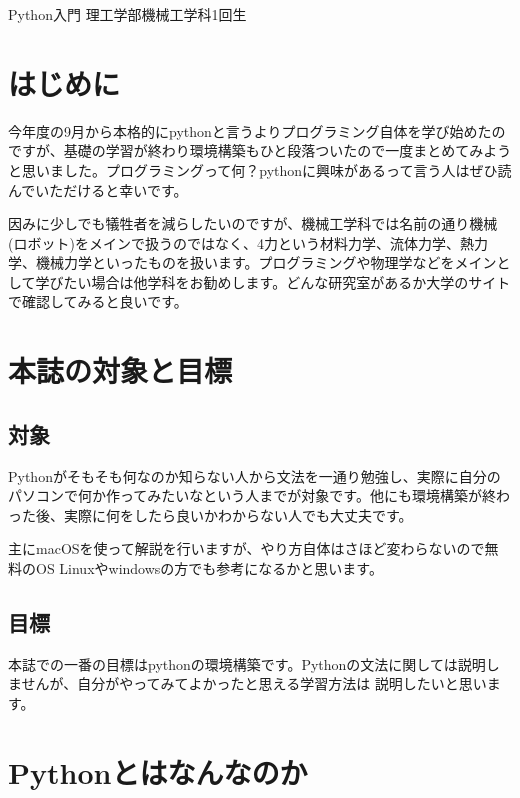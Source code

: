 \documentclass[10pt,b5paper,papersize,dvipdfmx]{jsbook}
\begin{document}


\kaishititle%
  {Python入門}%
  {理工学部機械工学科1回生}%
  {}%

%
\section*{はじめに}
今年度の9月から本格的にpythonと言うよりプログラミング自体を学び始めたのですが、基礎の学習が終わり環境構築もひと段落ついたので一度まとめてみようと思いました。プログラミングって何？pythonに興味があるって言う人はぜひ読んでいただけると幸いです。\par
因みに少しでも犠牲者を減らしたいのですが、機械工学科では名前の通り機械(ロボット)をメインで扱うのではなく、4力という材料力学、流体力学、熱力学、機械力学といったものを扱います。プログラミングや物理学などをメインとして学びたい場合は他学科をお勧めします。どんな研究室があるか大学のサイトで確認してみると良いです。\par
%
\clearpage
\section{本誌の対象と目標}
\subsection{対象}
Pythonがそもそも何なのか知らない人から文法を一通り勉強し、実際に自分のパソコンで何か作ってみたいなという人までが対象です。他にも環境構築が終わった後、実際に何をしたら良いかわからない人でも大丈夫です。\par
主にmacOSを使って解説を行いますが、やり方自体はさほど変わらないので無料のOS Linuxやwindowsの方でも参考になるかと思います。\par
\subsection{目標}
本誌での一番の目標はpythonの環境構築です。Pythonの文法に関しては説明しませんが、自分がやってみてよかったと思える学習方法は
説明したいと思います。\par
\section{Pythonとはなんなのか}
\end{document}

